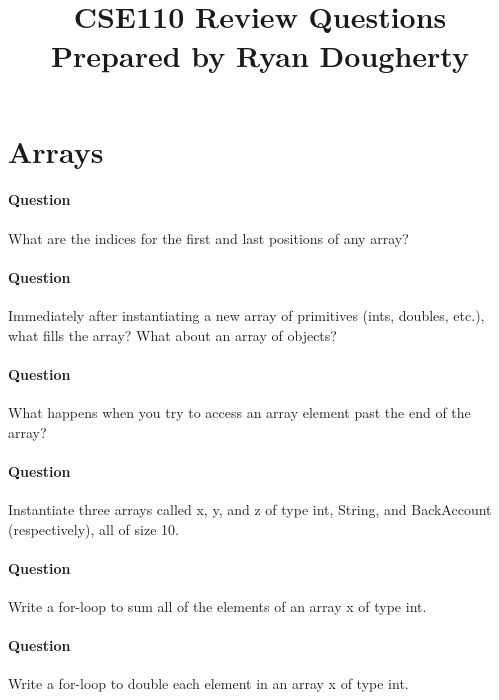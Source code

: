\documentclass{article}
\date{}
\begin{document}
\title{\textbf{CSE110 Review Questions \\
Prepared by Ryan Dougherty}}
\maketitle

\section*{Arrays}


\setcounter{question_num}{1}
\paragraph{Question }
What are the indices for the first and last positions of any array?

\addtocounter{question_num}{1}
\paragraph{Question }
Immediately after instantiating a new array of primitives (ints, doubles, etc.), what fills the array? What about an array of objects?

\addtocounter{question_num}{1}
\paragraph{Question }
What happens when you try to access an array element past the end of the array?

\addtocounter{question_num}{1}
\paragraph{Question }
Instantiate three arrays called x, y, and z of type int, String, and BackAccount (respectively), all of size 10.

\addtocounter{question_num}{1}
\paragraph{Question }
Write a for-loop to sum all of the elements of an array x of type int.

\addtocounter{question_num}{1}
\paragraph{Question }
Write a for-loop to double each element in an array x of type int.
\end{document}
